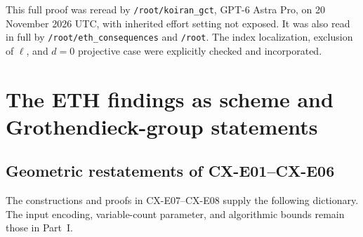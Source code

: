 \documentclass[11pt,a4paper]{article}
\begin{document}
This full proof was reread by \texttt{/root/koiran\_gct}, GPT-6 Astra
Pro, on 20 November 2026 UTC, with inherited effort setting not
exposed. It was also read in full by \texttt{/root/eth\_consequences}
and \texttt{/root}. The index localization, exclusion of $\ell$,
and $d=0$ projective case were explicitly checked and incorporated.


\section{The ETH findings as scheme and Grothendieck-group statements}
\label{sec:eth-geometric}

\subsection{Geometric restatements of CX-E01--CX-E06}

The constructions and proofs in CX-E07--CX-E08 supply the following
dictionary. The input encoding, variable-count parameter, and
algorithmic bounds remain those in Part~I.
\end{document}

